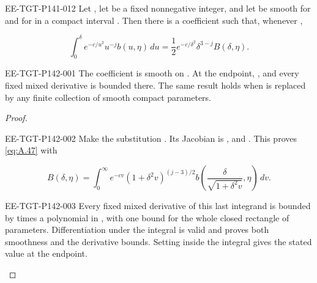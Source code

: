 \begin{lemma}\label{lem:A.9}
\begin{EESegment}{EE-TGT-P141-012}
Let , let  be a fixed nonnegative integer, and let
 be smooth for  and for
 in a compact interval . Then there is a coefficient
 such that, whenever ,
\end{EESegment}
\begin{equation}
  \int_0^\delta e^{-c/u^2}u^{-j}b(u,\eta)\,du
  =\frac12e^{-c/\delta^2}\delta^{3-j}B(\delta,\eta).
  \tag{A.47}\label{eq:A.47}
\end{equation}

%
\begin{EESegment}{EE-TGT-P142-001}
The coefficient  is smooth on
. At the endpoint,
, and every fixed mixed derivative is bounded there. The same result holds
when  is replaced by any finite collection of smooth compact parameters.
\end{EESegment}
\end{lemma}

\begin{proof}
\begin{EESegment}{EE-TGT-P142-002}
Make the substitution . Its Jacobian is
, and
. This proves \eqref{eq:A.47} with
\end{EESegment}
\[
  B(\delta,\eta)=\int_0^\infty e^{-cv}(1+\delta^2v)^{(j-3)/2}
  b\!\left(\frac{\delta}{\sqrt{1+\delta^2v}},\eta\right)\,dv.
\]
\begin{EESegment}{EE-TGT-P142-003}
Every fixed mixed derivative of this last integrand is bounded by  times a polynomial in
, with one bound for the whole closed rectangle of parameters. Differentiation under the
integral is valid and proves both smoothness and the derivative bounds. Setting
 inside the integral gives the stated value at the endpoint.
\end{EESegment}
\end{proof}

